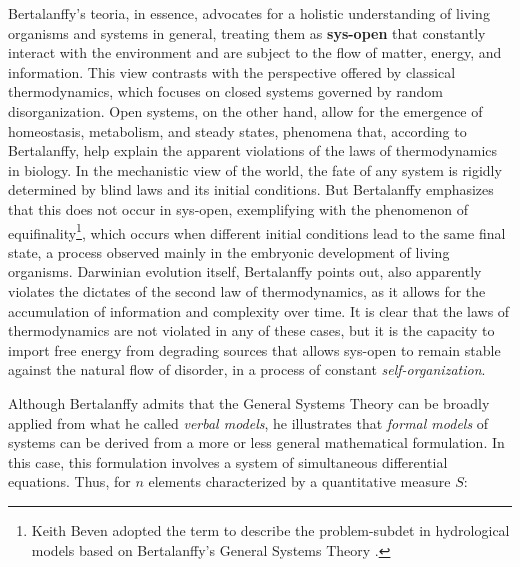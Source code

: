 \documentclass[./main_en.tex]{subfiles}
\begin{document}
\par Bertalanffy's \gls{teoria}, in essence, advocates for a holistic understanding of living organisms and systems in general, treating them as \textbf{\gls{sys-open}} that constantly interact with the environment and are subject to the flow of matter, energy, and information. This view contrasts with the perspective offered by classical thermodynamics, which focuses on closed systems governed by random disorganization. Open systems, on the other hand, allow for the emergence of homeostasis, metabolism, and steady states, phenomena that, according to Bertalanffy, help explain the apparent violations of the laws of thermodynamics in biology. In the mechanistic view of the world, the fate of any \gls{system} is rigidly determined by blind laws and its initial conditions. But Bertalanffy emphasizes that this does not occur in \gls{sys-open}, exemplifying with the phenomenon of equifinality\footnote{Keith Beven adopted the term  to describe the \gls{problem-subdet} in hydrological models based on Bertalanffy's General Systems Theory \cite{Beven2012}.}, which occurs when different initial conditions lead to the same final state, a process observed mainly in the embryonic development of living organisms. Darwinian evolution itself, Bertalanffy points out, also apparently violates the dictates of the second law of thermodynamics, as it allows for the accumulation of information and complexity over time. It is clear that the laws of thermodynamics are not violated in any of these cases, but it is the capacity to import free energy from degrading sources that allows \gls{sys-open} to remain stable against the natural flow of disorder, in a process of constant \textit{self-organization}.

\par Although Bertalanffy admits that the General Systems Theory can be broadly applied from what he called \textit{verbal models}, he illustrates that \textit{formal models} of systems can be derived from a more or less general mathematical formulation. In this case, this formulation involves a \gls{system} of simultaneous differential equations. Thus, for $n$ elements characterized by a quantitative measure $S$:
\end{document}
